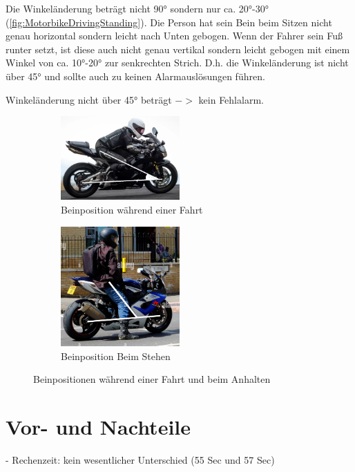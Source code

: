 Die Winkeländerung beträgt nicht \ang{90} sondern nur ca. \ang{20}-\ang{30} (\autoref{fig:MotorbikeDrivingStanding}). Die Person hat sein Bein beim Sitzen nicht genau horizontal sondern leicht nach Unten gebogen. Wenn der Fahrer sein Fuß runter setzt, ist diese auch nicht genau vertikal sondern leicht gebogen mit einem Winkel von ca. \ang{10}-\ang{20} zur senkrechten Strich. D.h. die Winkeländerung ist nicht über \ang{45} und sollte auch zu keinen Alarmauslösungen führen.


Winkeländerung nicht über \ang{45} beträgt $->$ kein Fehlalarm.

\begin{figure}[H]
	\centering
	\begin{subfigure}{\textwidth}
		\centering
		\includegraphics[width=0.5\textwidth]{Bilder/MotorbikeDriving2.png}
		\caption{Beinposition während einer Fahrt}
		\label{fig:MotorbikeDriving}
	\end{subfigure}
	\hfill
	\begin{subfigure}{\textwidth}
		\centering
		\includegraphics[width=0.5\textwidth]{Bilder/MotorbikeStanding2.png}
		\caption{Beinposition Beim Stehen}
		\label{fig:MotorbikeStanding2}
	\end{subfigure}
	\caption{Beinpositionen während einer Fahrt und beim Anhalten}
	\label{fig:MotorbikeDrivingStanding}
\end{figure}


\section{Vor- und Nachteile}
- Rechenzeit: kein wesentlicher Unterschied (55 Sec und 57 Sec)





 